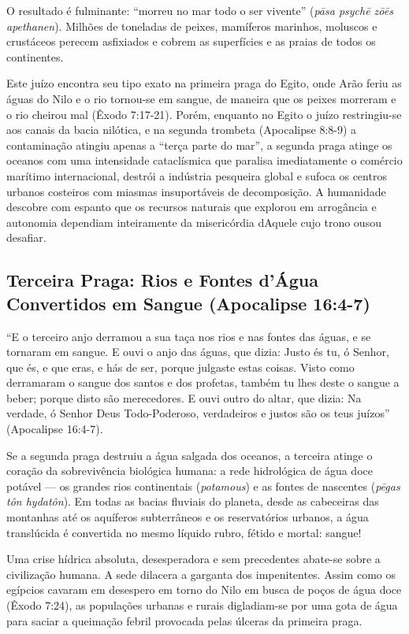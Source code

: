 O resultado é fulminante: ``morreu no mar todo o ser vivente'' (\textit{pāsa psychē zōēs apethanen}). Milhões de toneladas de peixes, mamíferos marinhos, moluscos e crustáceos perecem asfixiados e cobrem as superfícies e as praias de todos os continentes.

Este juízo encontra seu tipo exato na primeira praga do Egito, onde Arão feriu as águas do Nilo e o rio tornou-se em sangue, de maneira que os peixes morreram e o rio cheirou mal (Êxodo 7:17-21). Porém, enquanto no Egito o juízo restringiu-se aos canais da bacia nilótica, e na segunda trombeta (Apocalipse 8:8-9) a contaminação atingiu apenas a ``terça parte do mar'', a segunda praga atinge os oceanos com uma intensidade cataclísmica que paralisa imediatamente o comércio marítimo internacional, destrói a indústria pesqueira global e sufoca os centros urbanos costeiros com miasmas insuportáveis de decomposição. A humanidade descobre com espanto que os recursos naturais que explorou em arrogância e autonomia dependiam inteiramente da misericórdia dAquele cujo trono ousou desafiar.



\subsection{Terceira Praga: Rios e Fontes d'Água Convertidos em Sangue (Apocalipse 16:4-7)}


``E o terceiro anjo derramou a sua taça nos rios e nas fontes das águas, e se tornaram em sangue. E ouvi o anjo das águas, que dizia: Justo és tu, ó Senhor, que és, e que eras, e hás de ser, porque julgaste estas coisas. Visto como derramaram o sangue dos santos e dos profetas, também tu lhes deste o sangue a beber; porque disto são merecedores. E ouvi outro do altar, que dizia: Na verdade, ó Senhor Deus Todo-Poderoso, verdadeiros e justos são os teus juízos'' (Apocalipse 16:4-7).

Se a segunda praga destruiu a água salgada dos oceanos, a terceira atinge o coração da sobrevivência biológica humana: a rede hidrológica de água doce potável — os grandes rios continentais (\textit{potamous}) e as fontes de nascentes (\textit{pēgas tôn hydatôn}). Em todas as bacias fluviais do planeta, desde as cabeceiras das montanhas até os aquíferos subterrâneos e os reservatórios urbanos, a água translúcida é convertida no mesmo líquido rubro, fétido e mortal: sangue!

Uma crise hídrica absoluta, desesperadora e sem precedentes abate-se sobre a civilização humana. A sede dilacera a garganta dos impenitentes. Assim como os egípcios cavaram em desespero em torno do Nilo em busca de poços de água doce (Êxodo 7:24), as populações urbanas e rurais digladiam-se por uma gota de água para saciar a queimação febril provocada pelas úlceras da primeira praga.

